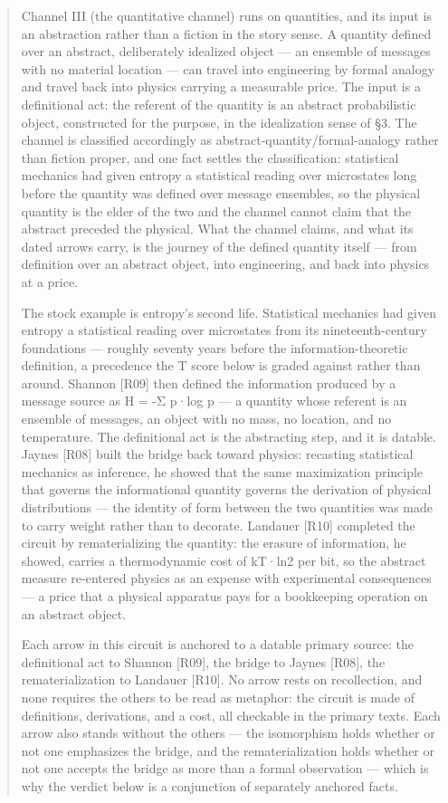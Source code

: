 \documentclass[11pt,a4paper]{article}
\begin{document}
\begin{abstract}
Channel III (the quantitative channel) runs on quantities, and its input is an abstraction rather than a fiction in the story sense. A quantity defined over an abstract, deliberately idealized object — an ensemble of messages with no material location — can travel into engineering by formal analogy and travel back into physics carrying a measurable price. The input is a definitional act: the referent of the quantity is an abstract probabilistic object, constructed for the purpose, in the idealization sense of §3. The channel is classified accordingly as abstract-quantity/formal-analogy rather than fiction proper, and one fact settles the classification: statistical mechanics had given entropy a statistical reading over microstates long before the quantity was defined over message ensembles, so the physical quantity is the elder of the two and the channel cannot claim that the abstract preceded the physical. What the channel claims, and what its dated arrows carry, is the journey of the defined quantity itself — from definition over an abstract object, into engineering, and back into physics at a price.

The stock example is entropy's second life. Statistical mechanics had given entropy a statistical reading over microstates from its nineteenth-century foundations — roughly seventy years before the information-theoretic definition, a precedence the T score below is graded against rather than around. Shannon [R09] then defined the information produced by a message source as H = -Σ p·log p — a quantity whose referent is an ensemble of messages, an object with no mass, no location, and no temperature. The definitional act is the abstracting step, and it is datable. Jaynes [R08] built the bridge back toward physics: recasting statistical mechanics as inference, he showed that the same maximization principle that governs the informational quantity governs the derivation of physical distributions — the identity of form between the two quantities was made to carry weight rather than to decorate. Landauer [R10] completed the circuit by rematerializing the quantity: the erasure of information, he showed, carries a thermodynamic cost of kT·ln2 per bit, so the abstract measure re-entered physics as an expense with experimental consequences — a price that a physical apparatus pays for a bookkeeping operation on an abstract object.

Each arrow in this circuit is anchored to a datable primary source: the definitional act to Shannon [R09], the bridge to Jaynes [R08], the rematerialization to Landauer [R10]. No arrow rests on recollection, and none requires the others to be read as metaphor: the circuit is made of definitions, derivations, and a cost, all checkable in the primary texts. Each arrow also stands without the others — the isomorphism holds whether or not one emphasizes the bridge, and the rematerialization holds whether or not one accepts the bridge as more than a formal observation — which is why the verdict below is a conjunction of separately anchored facts.


\end{abstract}
\end{document}
